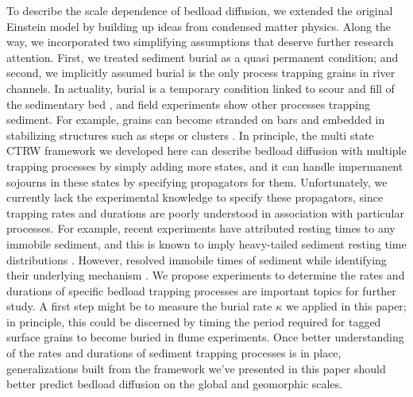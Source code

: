 \documentclass[draft,grl]{agujournal2018}
\begin{document}
To describe the scale dependence of bedload diffusion, we extended the original Einstein model by building up ideas from condensed matter physics.
Along the way, we incorporated two simplifying assumptions that deserve further research attention. 
First, we treated sediment burial as a quasi permanent condition; and second, we implicitly assumed burial is the only process trapping grains in river channels.
In actuality, burial is a temporary condition linked to scour and fill of the sedimentary bed \citep{Hassan1994,Voepel2013,Martin2014,Wu2019a}, and field experiments show other processes trapping sediment.
For example, grains can become stranded on bars \citep{Ferguson2002,Bradley2017} and embedded in stabilizing structures such as steps or clusters \citep[e.g.][]{Church1998,Hassan2008}.
In principle, the multi state CTRW framework we developed here can describe bedload diffusion with multiple trapping processes by simply adding more states, and it can handle impermanent sojourns in these states by specifying propagators for them.
Unfortunately, we currently lack the experimental knowledge to specify these propagators, since trapping rates and durations are poorly understood in association with particular processes.
For example, recent experiments have attributed resting times to any immobile sediment, and this is known to imply heavy-tailed sediment resting time distributions \citep[e.g.,][]{Olinde2015,Bradley2017}.
However,  resolved immobile times of sediment while identifying their underlying mechanism \citep{Martin2014}.
We propose experiments to determine the rates and durations of specific bedload trapping processes are important topics for further study.
A first step might be to measure the burial rate $\kappa$ we applied in this paper; in principle, this could be discerned by timing the period required for tagged surface grains to become buried in flume experiments.
Once better understanding of the rates and durations of sediment trapping processes is in place, generalizations built from the framework we've presented in this paper should better predict bedload diffusion on the global and geomorphic scales.
\end{document}
